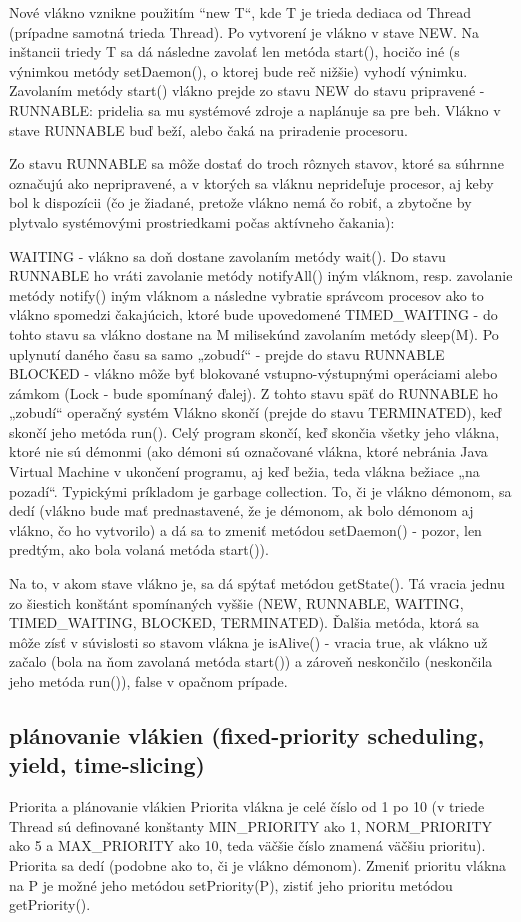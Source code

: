 		Nové vlákno vznikne použitím “new T“, kde T je trieda dediaca od Thread (prípadne samotná trieda Thread). Po vytvorení je vlákno v stave NEW. Na inštancii triedy T sa dá následne zavolať len metóda start(), hocičo iné (s výnimkou metódy setDaemon(), o ktorej bude reč nižšie) vyhodí výnimku. Zavolaním metódy start() vlákno prejde zo stavu NEW do stavu pripravené - RUNNABLE: pridelia sa mu systémové zdroje a naplánuje sa pre beh. Vlákno v stave RUNNABLE buď beží, alebo čaká na priradenie procesoru.

		Zo stavu RUNNABLE sa môže dostať do troch rôznych stavov, ktoré sa súhrnne označujú ako nepripravené, a v ktorých sa vláknu neprideľuje procesor, aj keby bol k dispozícii (čo je žiadané, pretože vlákno nemá čo robiť, a zbytočne by plytvalo systémovými prostriedkami počas aktívneho čakania):

		WAITING - vlákno sa doň dostane zavolaním metódy wait(). Do stavu RUNNABLE ho vráti zavolanie metódy notifyAll() iným vláknom, resp. zavolanie metódy notify() iným vláknom a následne vybratie správcom procesov ako to vlákno spomedzi čakajúcich, ktoré bude upovedomené
		TIMED\_WAITING - do tohto stavu sa vlákno dostane na M milisekúnd zavolaním metódy sleep(M). Po uplynutí daného času sa samo „zobudí“ - prejde do stavu RUNNABLE
		BLOCKED - vlákno môže byť blokované vstupno-výstupnými operáciami alebo zámkom (Lock - bude spomínaný ďalej). Z tohto stavu späť do RUNNABLE ho „zobudí“ operačný systém
		Vlákno skončí (prejde do stavu TERMINATED), keď skončí jeho metóda run(). Celý program skončí, keď skončia všetky jeho vlákna, ktoré nie sú démonmi (ako démoni sú označované vlákna, ktoré nebránia Java Virtual Machine v ukončení programu, aj keď bežia, teda vlákna bežiace „na pozadí“. Typickými príkladom je garbage collection. To, či je vlákno démonom, sa dedí (vlákno bude mať prednastavené, že je démonom, ak bolo démonom aj vlákno, čo ho vytvorilo) a dá sa to zmeniť metódou setDaemon() - pozor, len predtým, ako bola volaná metóda start()).

		Na to, v akom stave vlákno je, sa dá spýtať metódou getState(). Tá vracia jednu zo šiestich konštánt spomínaných vyššie (NEW, RUNNABLE, WAITING, TIMED\_WAITING, BLOCKED, TERMINATED). Ďalšia metóda, ktorá sa môže zísť v súvislosti so stavom vlákna je isAlive() - vracia true, ak vlákno už začalo (bola na ňom zavolaná metóda start()) a zároveň neskončilo (neskončila jeho metóda run()), false v opačnom prípade.


	\subsection{plánovanie vlákien (fixed-priority scheduling, yield, time-slicing)}
Priorita a plánovanie vlákien
Priorita vlákna je celé číslo od 1 po 10 (v triede Thread sú definované konštanty MIN\_PRIORITY ako 1, NORM\_PRIORITY ako 5 a MAX\_PRIORITY ako 10, teda väčšie číslo znamená väčšiu prioritu). Priorita sa dedí (podobne ako to, či je vlákno démonom). Zmeniť prioritu vlákna na P je možné jeho metódou setPriority(P), zistiť jeho prioritu metódou getPriority().


